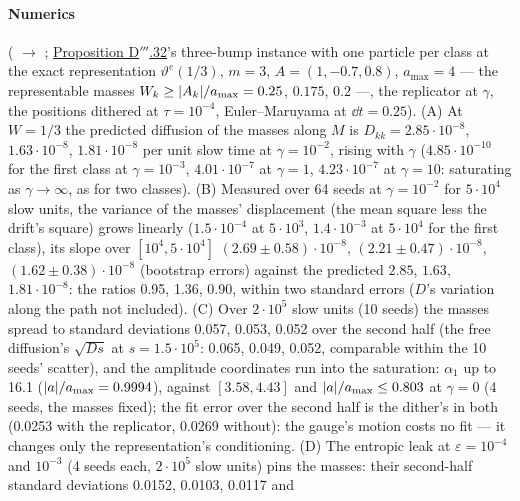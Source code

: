 \begin{sloppypar}
\paragraph{Numerics} ( $\to$ ;
\hyperref[res:thmDppp:32]{Proposition D$'''$.32}'s three-bump instance with one particle per class at the exact
representation $\vartheta^e(1/3)$, $m = 3$, $A = (1,-0.7,0.8)$, $a_{\max} = 4$ --- the representable masses
$W_k\ge\lvert A_k\rvert/a_{\max} = 0.25$, $0.175$, $0.2$ ---, the replicator at $\gamma$, the positions dithered at
$\tau = 10^{-4}$, Euler--Maruyama at $\dd t = 0.25$). (A) At $W = 1/3$ the predicted diffusion of the masses along $M$
is $D_{kk} = 2.85\cdot10^{-8}$, $1.63\cdot10^{-8}$, $1.81\cdot10^{-8}$ per unit slow time at $\gamma = 10^{-2}$,
rising with $\gamma$ ($4.85\cdot10^{-10}$ for the first class at $\gamma = 10^{-3}$, $4.01\cdot10^{-7}$ at $\gamma = 1$,
$4.23\cdot10^{-7}$ at $\gamma = 10$: saturating as $\gamma\to\infty$, as for two classes). (B) Measured over 64 seeds at
$\gamma = 10^{-2}$ for $5\cdot10^4$ slow units, the variance of the masses' displacement (the mean square less the
drift's square) grows linearly ($1.5\cdot10^{-4}$ at $5\cdot10^3$, $1.4\cdot10^{-3}$ at $5\cdot10^4$ for the first
class), its slope over $[10^4,5\cdot10^4]$ $(2.69\pm0.58)\cdot10^{-8}$, $(2.21\pm0.47)\cdot10^{-8}$,
$(1.62\pm0.38)\cdot10^{-8}$ (bootstrap errors) against the predicted $2.85$, $1.63$, $1.81\cdot10^{-8}$: the ratios
0.95, 1.36, 0.90, within two standard errors ($D$'s variation along the path not included). (C) Over $2\cdot10^5$ slow
units (10 seeds) the masses spread to standard deviations 0.057, 0.053, 0.052 over the second half (the free
diffusion's $\sqrt{Ds}$ at $s = 1.5\cdot10^5$: 0.065, 0.049, 0.052, comparable within the 10 seeds' scatter), and the
amplitude coordinates run into the saturation: $\alpha_1$ up to 16.1 ($\lvert a\rvert/a_{\max} = 0.9994$), against
$[3.58,4.43]$ and $\lvert a\rvert/a_{\max}\le0.803$ at $\gamma = 0$ (4 seeds, the masses fixed); the fit error over the second
half is the dither's in both (0.0253 with the replicator, 0.0269 without): the gauge's motion costs no fit --- it
changes only the representation's conditioning. (D) The entropic leak at $\varepsilon = 10^{-4}$ and $10^{-3}$ (4 seeds
each, $2\cdot10^5$ slow units) pins the masses: their second-half standard deviations 0.0152, 0.0103, 0.0117 and

\end{sloppypar}
